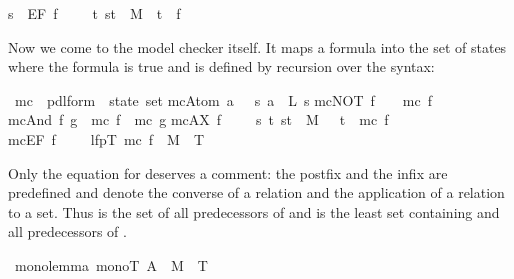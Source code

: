 \begin{isabellebody}
{\isachardoublequote}s\ {\isasymTurnstile}\ EF\ f\ \ \ \ {\isacharequal}\ {\isacharparenleft}{\isasymexists}t{\isachardot}\ {\isacharparenleft}s{\isacharcomma}t{\isacharparenright}\ {\isasymin}\ M{\isacharcircum}{\isacharasterisk}\ {\isasymand}\ t\ {\isasymTurnstile}\ f{\isacharparenright}{\isachardoublequote}%
\begin{isamarkuptext}%
Now we come to the model checker itself. It maps a formula into the set of
states where the formula is true and is defined by recursion over the syntax:%
\end{isamarkuptext}%
\ mc\ {\isacharcolon}{\isacharcolon}\ {\isachardoublequote}pdl{\isacharunderscore}form\ {\isasymRightarrow}\ state\ set{\isachardoublequote}\isanewline
{}\isanewline
{\isachardoublequote}mc{\isacharparenleft}Atom\ a{\isacharparenright}\ \ {\isacharequal}\ {\isacharbraceleft}s{\isachardot}\ a\ {\isasymin}\ L\ s{\isacharbraceright}{\isachardoublequote}\isanewline
{\isachardoublequote}mc{\isacharparenleft}NOT\ f{\isacharparenright}\ \ \ {\isacharequal}\ {\isacharminus}mc\ f{\isachardoublequote}\isanewline
{\isachardoublequote}mc{\isacharparenleft}And\ f\ g{\isacharparenright}\ {\isacharequal}\ mc\ f\ {\isasyminter}\ mc\ g{\isachardoublequote}\isanewline
{\isachardoublequote}mc{\isacharparenleft}AX\ f{\isacharparenright}\ \ \ \ {\isacharequal}\ {\isacharbraceleft}s{\isachardot}\ {\isasymforall}t{\isachardot}\ {\isacharparenleft}s{\isacharcomma}t{\isacharparenright}\ {\isasymin}\ M\ \ {\isasymlongrightarrow}\ t\ {\isasymin}\ mc\ f{\isacharbraceright}{\isachardoublequote}\isanewline
{\isachardoublequote}mc{\isacharparenleft}EF\ f{\isacharparenright}\ \ \ \ {\isacharequal}\ lfp{\isacharparenleft}{\isasymlambda}T{\isachardot}\ mc\ f\ {\isasymunion}\ M{\isacharcircum}{\isacharminus}\ {\isacharcircum}{\isacharcircum}\ T{\isacharparenright}{\isachardoublequote}%
\begin{isamarkuptext}%
Only the equation for  deserves a comment: the postfix 
and the infix \isa{{\isacharcircum}{\isacharcircum}} are predefined and denote the converse of a
relation and the application of a relation to a set. Thus 
is the set of all predecessors of  and  is the least
set  containing  and all predecessors of .%
\end{isamarkuptext}%
\ mono{\isacharunderscore}lemma{\isacharcolon}\ {\isachardoublequote}mono{\isacharparenleft}{\isasymlambda}T{\isachardot}\ A\ {\isasymunion}\ M{\isacharcircum}{\isacharminus}\ {\isacharcircum}{\isacharcircum}\ T{\isacharparenright}{\isachardoublequote}\isanewline

\end{isabellebody}
